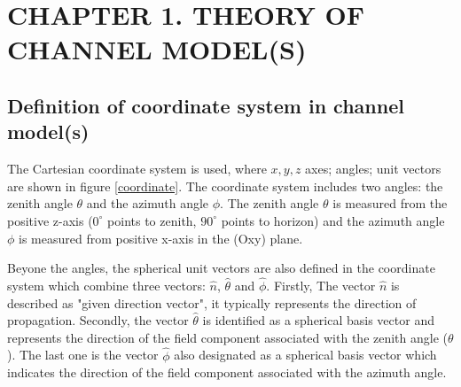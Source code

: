 \documentclass{article} %
\begin{document}

%




\tableofcontents 
\thispagestyle{empty}
\cleardoublepage



{\let\oldnumberline\numberline
\renewcommand{\numberline}{Figure~\oldnumberline}
\listoffigures} 
\newpage




\section*{CHAPTER 1. THEORY OF CHANNEL MODEL(S)}
\setcounter{section}{1}
\setcounter{figure}{0}
\setcounter{table}{0}
\subsection{Definition of coordinate system in channel model(s)}
The Cartesian coordinate system is used, where $x, y, z$ axes; angles; unit vectors are shown in figure \ref{coordinate}. The coordinate system includes two angles: the zenith angle $\theta$ and the azimuth angle $\phi$. The zenith angle $\theta$ is measured from the positive z-axis ($0^\circ$ points to zenith, $90^\circ$ points to horizon) and the azimuth angle $\phi$ is measured from positive x-axis in the (Oxy) plane.

Beyone the angles, the spherical unit vectors are also defined in the coordinate system which combine three vectors: $\hat{n}$, $\hat{\theta}$ and $\hat{\phi}$. Firstly, The vector $\hat{n}$ is described as "given direction vector", it typically represents the direction of propagation. Secondly, the vector $\hat{\theta}$ is identified as a spherical basis vector and represents the direction of the field component associated with the zenith angle ($\theta$). The last one is the vector $\hat{\phi}$ also designated as a spherical basis vector which indicates the direction of the field component associated with the azimuth angle.
\end{document}
